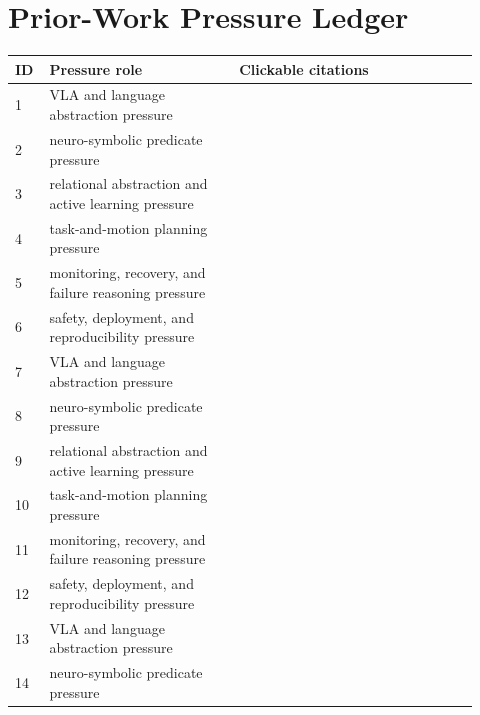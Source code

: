 \documentclass[11pt]{article}
\begin{document}
\section{Prior-Work Pressure Ledger}
\label{app:citations}
\small
\begin{longtable}{p{0.06\linewidth}p{0.38\linewidth}p{0.48\linewidth}}
\toprule
ID & Pressure role & Clickable citations \\
\midrule
1 & VLA and language abstraction pressure & \citep{li2023embodied1,liang2024visualpredicator2,devinda3} \\
2 & neuro-symbolic predicate pressure & \citep{farid2026vision4,ahn2025towards5,park2025hierarchical6} \\
3 & relational abstraction and active learning pressure & \citep{pang2025integrating7,shao2025breaking8,wu2023embodied9} \\
4 & task-and-motion planning pressure & \citep{shao2024breaking10,chen2026oowm11,liu2026bioproagent12} \\
5 & monitoring, recovery, and failure reasoning pressure & \citep{virwani2025loop13,yang2023weizenbaums14,pallagani2024on15} \\
6 & safety, deployment, and reproducibility pressure & \citep{vinay2026a16,wang2024llm17,mooneeram2013literary18} \\
7 & VLA and language abstraction pressure & \citep{berahman2009probabilistic19,ying2025agentsafe20,jenamani2020robotic21} \\
8 & neuro-symbolic predicate pressure & \citep{francis2022core22,huang2026neurosymbolic23,hayes2025finegrain24} \\
9 & relational abstraction and active learning pressure & \citep{capitanelli2024a25,chaudhary2026revealing26,agia2024unpacking27} \\
10 & task-and-motion planning pressure & \citep{kambhampati2023on28,johnson2023critical29,li2025survey30} \\
11 & monitoring, recovery, and failure reasoning pressure & \citep{andreyev2026bounding31,chen2026from32,zhu2025psalmv33} \\
12 & safety, deployment, and reproducibility pressure & \citep{dawson2023a34,basir2022critical35,diwakaruni2026ai36} \\
13 & VLA and language abstraction pressure & \citep{vegabrown2018admissible37,deng2025automating38,chatterjeendinferencetime39} \\
14 & neuro-symbolic predicate pressure & \citep{olaiya2025from40,kong2025embodied41,liu2012planning42} \\

\end{longtable}
\end{document}
